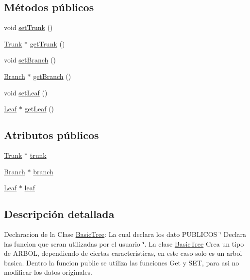 \subsection*{Métodos públicos}
\begin{DoxyCompactItemize}
\item 
void \mbox{\hyperlink{class_basic_tree_a195c3f52d1d808d558657c200423a9f7}{set\+Trunk}} ()
\item 
\mbox{\hyperlink{class_trunk}{Trunk}} $\ast$ \mbox{\hyperlink{class_basic_tree_ae2071a8f7b8eb677032ef22d0943da33}{get\+Trunk}} ()
\item 
void \mbox{\hyperlink{class_basic_tree_acd2eb120901e13f87cc30526464edac3}{set\+Branch}} ()
\item 
\mbox{\hyperlink{class_branch}{Branch}} $\ast$ \mbox{\hyperlink{class_basic_tree_aeb2d743d8c5cad3c1ffdda0671447b3e}{get\+Branch}} ()
\item 
void \mbox{\hyperlink{class_basic_tree_a2d34981cfa0c29fa7848cfa83478b512}{set\+Leaf}} ()
\item 
\mbox{\hyperlink{class_leaf}{Leaf}} $\ast$ \mbox{\hyperlink{class_basic_tree_ac7f05f760caf9e3ba9c0c07c7e16d2eb}{get\+Leaf}} ()
\end{DoxyCompactItemize}
\subsection*{Atributos públicos}
\begin{DoxyCompactItemize}
\item 
\mbox{\hyperlink{class_trunk}{Trunk}} $\ast$ \mbox{\hyperlink{class_basic_tree_ace2c7d40cde2b75633b634bfee0818d5}{trunk}}
\item 
\mbox{\hyperlink{class_branch}{Branch}} $\ast$ \mbox{\hyperlink{class_basic_tree_a329685c53fd6e5e27d58df683e0ad486}{branch}}
\item 
\mbox{\hyperlink{class_leaf}{Leaf}} $\ast$ \mbox{\hyperlink{class_basic_tree_a396fcfd963f9f5f845a2ca661ce020f7}{leaf}}
\end{DoxyCompactItemize}


\subsection{Descripción detallada}
Declaracion de la Clase \mbox{\hyperlink{class_basic_tree}{Basic\+Tree}}\+: La cual declara los dato P\+U\+B\+L\+I\+C\+OS \char`\"{} Declara las funcion que seran utilizadas por el usuario \char`\"{}. La clase \mbox{\hyperlink{class_basic_tree}{Basic\+Tree}} Crea un tipo de A\+R\+B\+OL, dependiendo de ciertas caracteristicas, en este caso solo es un arbol basica. Dentro la funcion public se utiliza las funciones Get y S\+ET, para asi no modificar los datos originales. 

